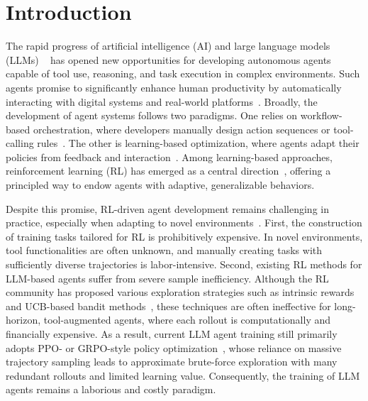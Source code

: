 \section{Introduction}

The rapid progress of artificial intelligence (AI) and large language models (LLMs) ~\citep{liu2024deepseek, qwen2025technical} has opened new opportunities for developing autonomous agents capable of tool use, reasoning, and task execution in complex environments. Such agents promise to significantly enhance human productivity by automatically interacting with digital systems and real-world platforms~\citep{DBLP:conf/iclr/YaoZYDSN023, DBLP:conf/acl/DingTPWGDSC25,DBLP:journals/fcsc/QuDWCWYXW25}. 
Broadly, the development of agent systems follows two paradigms. One relies on workflow-based orchestration, where developers manually design action sequences or tool-calling rules~\citep{DBLP:conf/icml/DuW024, DBLP:conf/acl/0001YTSLD025}. The other is learning-based optimization, where agents adapt their policies from feedback and interaction~\citep{DBLP:journals/corr/abs-2503-23383,DBLP:journals/corr/abs-2509-13761}. Among learning-based approaches, reinforcement learning (RL) has emerged as a central direction~\citep{DBLP:journals/corr/abs-2509-12867}, offering a principled way to endow agents with adaptive, generalizable behaviors.

Despite this promise, RL-driven agent development remains challenging in practice, especially when adapting to novel environments~\citep{wang2025modeling,DBLP:journals/corr/abs-2509-02547}. 
First, the construction of training tasks tailored for RL is prohibitively expensive. In novel environments, tool functionalities are often unknown, and manually creating tasks with sufficiently diverse trajectories is labor-intensive. 
Second, existing RL methods for LLM-based agents suffer from severe sample inefficiency. Although the RL community has proposed various exploration strategies such as intrinsic rewards~\citep{DBLP:journals/corr/abs-2502-01456} and UCB-based bandit methods~\citep{song2025outcome}, these techniques are often ineffective for long-horizon, tool-augmented agents, where each rollout is computationally and financially expensive. As a result, current LLM agent training still primarily adopts PPO- or GRPO-style policy optimization~\citep{deepseek_math}, whose reliance on massive trajectory sampling leads to approximate brute-force exploration with many redundant rollouts and limited learning value. Consequently, the training of LLM agents remains a laborious and costly paradigm.


